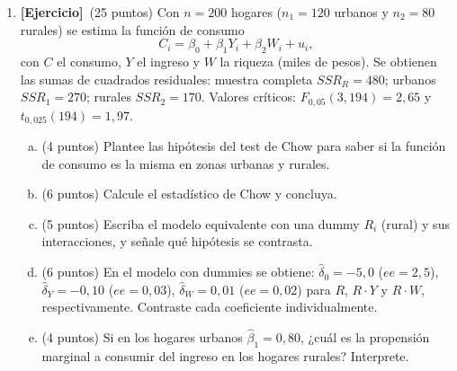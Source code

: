 \documentclass[12pt,letterpaper]{article}
\newcommand{\ejer}{\textbf{[Ejercicio]}}
\begin{document}
\begin{enumerate}[1.]
\item \ejer\ (25 puntos) Con $n=200$ hogares ($n_1=120$ urbanos y $n_2=80$ rurales) se estima la función de consumo
\[
C_i=\beta_0+\beta_1Y_i+\beta_2W_i+u_i ,
\]
con $C$ el consumo, $Y$ el ingreso y $W$ la riqueza (miles de pesos). Se obtienen las sumas de cuadrados residuales: muestra completa $SSR_R=480$; urbanos $SSR_1=270$; rurales $SSR_2=170$. Valores críticos: $F_{0{,}05}(3,194)=2{,}65$ y $t_{0{,}025}(194)=1{,}97$.
\begin{enumerate}[a)]
\item (4 puntos) Plantee las hipótesis del test de Chow para saber si la función de consumo es la misma en zonas urbanas y rurales.
\item (6 puntos) Calcule el estadístico de Chow y concluya.
\item (5 puntos) Escriba el modelo equivalente con una dummy $R_i$ (rural) y sus interacciones, y señale qué hipótesis se contrasta.
\item (6 puntos) En el modelo con dummies se obtiene: $\hat\delta_0=-5{,}0$ ($ee=2{,}5$), $\hat\delta_Y=-0{,}10$ ($ee=0{,}03$), $\hat\delta_W=0{,}01$ ($ee=0{,}02$) para $R$, $R\cdot Y$ y $R\cdot W$, respectivamente. Contraste cada coeficiente individualmente.
\item (4 puntos) Si en los hogares urbanos $\hat\beta_1=0{,}80$, ¿cuál es la propensión marginal a consumir del ingreso en los hogares rurales? Interprete.
\end{enumerate}


\end{enumerate}
\end{document}
